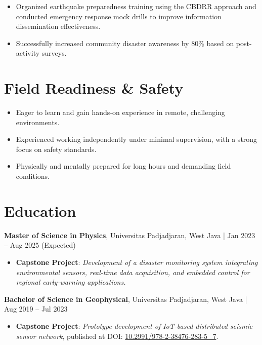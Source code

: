 \documentclass[10pt,a4paper]{article}
\begin{document}
\begin{itemize}[left=1.5em, noitemsep, topsep=0pt]
  \item Organized earthquake preparedness training using the CBDRR approach and conducted emergency response mock drills to improve information dissemination effectiveness.
  \item Successfully increased community disaster awareness by 80\% based on post-activity surveys.
\end{itemize}

\section*{Field Readiness \& Safety}

\begin{itemize}[left=1.5em, noitemsep, topsep=0pt]
  \item Eager to learn and gain hands-on experience in remote, challenging environments.
  \item Experienced working independently under minimal supervision, with a strong focus on safety standards.
  \item Physically and mentally prepared for long hours and demanding field conditions.
\end{itemize}

\section*{Education}

\setlength{\fboxsep}{0pt}%
\colorbox[HTML]{DCDCDC}{%
  \parbox{\linewidth}{%
    \textbf{Master of Science in Physics}, Universitas Padjadjaran, West Java \quad | \quad Jan 2023 – Aug 2025 (Expected)%
  }%
}
\begin{itemize}[left=1.5em, noitemsep, topsep=0pt]
  \item \textbf{Capstone Project}: \textit{Development of a disaster monitoring system integrating environmental sensors, real-time data acquisition, and embedded control for regional early-warning applications.}
\end{itemize}

\setlength{\fboxsep}{0pt}%
\colorbox[HTML]{DCDCDC}{%
  \parbox{\linewidth}{%
    \textbf{ Bachelor of Science in Geophysical}, Universitas Padjadjaran, West Java \quad | \quad Aug 2019 – Jul 2023%
  }%
}
{\raggedright\sloppy
\begin{itemize}[left=1.5em, noitemsep, topsep=0pt]
  \item \textbf{Capstone Project}: \textit{Prototype development of IoT-based distributed seismic sensor network}, published at \linebreak DOI: \href{https://doi.org/10.2991/978-2-38476-283-5_7}{10.2991/978-2-38476-283-5\_7}.
\end{itemize}
}
\end{document}
